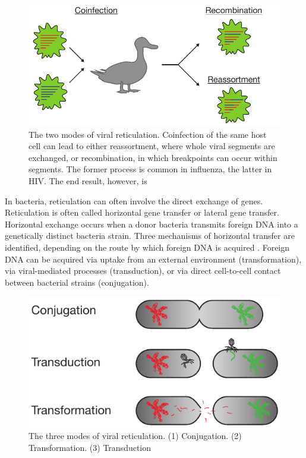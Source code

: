 \begin{figure}
\centering
\includegraphics[]{./fig/background/viral_reticulation.pdf}
\caption[Viral recombination and reassortment]{The two modes of viral reticulation. Coinfection of the same host cell can lead to either reassortment, where whole viral segments are exchanged, or recombination, in which breakpoints can occur within segments. The former process is common in influenza, the latter in HIV. The end result, however, is }
\label{fig:viral_reticulation}
\end{figure}

In bacteria, reticulation can often involve the direct exchange of genes.
Reticulation is often called horizontal gene transfer or lateral gene transfer.
Horizontal exchange occurs when a donor bacteria transmits foreign DNA into a genetically distinct bacteria strain.
Three mechanisms of horizontal transfer are identified, depending on the route by which foreign DNA is acquired \cite{Ochman:2000dr}.
Foreign DNA can be acquired via uptake from an external environment (transformation), via viral-mediated processes (transduction), or via direct cell-to-cell contact between bacterial strains (conjugation).

\begin{figure}
\centering
\includegraphics[]{./fig/background/bacterial_reticulation.pdf}
\caption[Three modes of bacterial reticulation]{The three modes of viral reticulation. (1) Conjugation. (2) Transformation. (3) Transduction}
\label{fig:bacterial_reticulation}
\end{figure}

